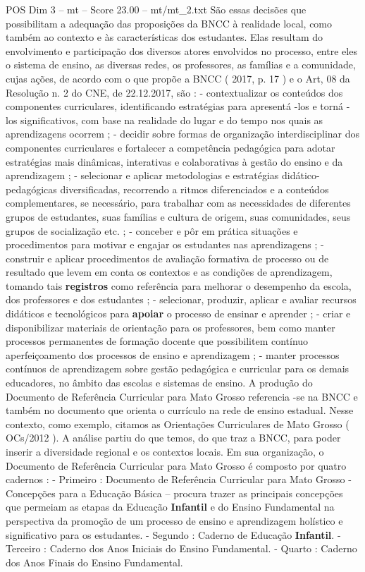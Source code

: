 \begin{textsample}{POS Dim 3 – mt – Score 23.00 – mt/mt\_2.txt}
São essas decisões que possibilitam a adequação das proposições da BNCC à realidade local, como também ao contexto e às características dos estudantes.
Elas resultam do envolvimento e participação dos diversos atores envolvidos no processo, entre eles o sistema de ensino, as diversas redes, os professores, as famílias e a comunidade, cujas ações, de acordo com o que propõe a BNCC ( 2017, p. 17 ) e o Art, 08 da Resolução n. 2 do CNE, de 22.12.2017, são : - contextualizar os conteúdos dos componentes curriculares, identificando estratégias para apresentá -los e torná -los significativos, com base na realidade do lugar e do tempo nos quais as aprendizagens ocorrem ; - decidir sobre formas de organização interdisciplinar dos componentes curriculares e fortalecer a competência pedagógica para adotar estratégias mais dinâmicas, interativas e colaborativas à gestão do ensino e da aprendizagem ; - selecionar e aplicar metodologias e estratégias didático-pedagógicas diversificadas, recorrendo a ritmos diferenciados e a conteúdos complementares, se necessário, para trabalhar com as necessidades de diferentes grupos de estudantes, suas famílias e cultura de origem, suas comunidades, seus grupos de socialização etc. ; - conceber e pôr em prática situações e procedimentos para motivar e engajar os estudantes nas aprendizagens ; - construir e aplicar procedimentos de avaliação formativa de processo ou de resultado que levem em conta os contextos e as condições de aprendizagem, tomando tais \textbf{registros} como referência para melhorar o desempenho da escola, dos professores e dos estudantes ; - selecionar, produzir, aplicar e avaliar recursos didáticos e tecnológicos para \textbf{apoiar} o processo de ensinar e aprender ; - criar e disponibilizar materiais de orientação para os professores, bem como manter processos permanentes de formação docente que possibilitem contínuo aperfeiçoamento dos processos de ensino e aprendizagem ; - manter processos contínuos de aprendizagem sobre gestão pedagógica e curricular para os demais educadores, no âmbito das escolas e sistemas de ensino.
A produção do Documento de Referência Curricular para Mato Grosso referencia -se na BNCC e também no documento que orienta o currículo na rede de ensino estadual.
Nesse contexto, como exemplo, citamos as Orientações Curriculares de Mato Grosso ( OCs/2012 ).
A análise partiu do que temos, do que traz a BNCC, para poder inserir a diversidade regional e os contextos locais.
Em sua organização, o Documento de Referência Curricular para Mato Grosso é composto por quatro cadernos : - Primeiro : Documento de Referência Curricular para Mato Grosso - Concepções para a Educação Básica – procura trazer as principais concepções que permeiam as etapas da Educação \textbf{Infantil} e do Ensino Fundamental na perspectiva da promoção de um processo de ensino e aprendizagem holístico e significativo para os estudantes. - Segundo : Caderno de Educação \textbf{Infantil}. - Terceiro : Caderno dos Anos Iniciais do Ensino Fundamental. - Quarto : Caderno dos Anos Finais do Ensino Fundamental.

\end{textsample}
